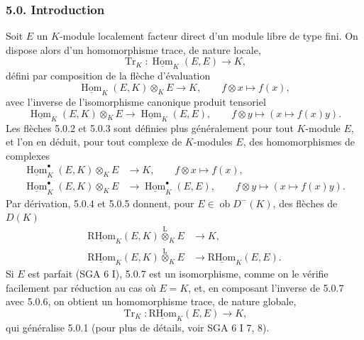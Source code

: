 \documentclass[11pt]{article}
\DeclareMathOperator{\Hom}{Hom}
\newcommand{\R}{\mathrm{R}}\newcommand{\RHomCore}{\mathrm{RHom}}
\newcommand{\ob}{\operatorname{ob}}
\providecommand{\RHom}{\RHomCore}
\providecommand{\uRHom}{\underline{\RHom}}
\providecommand{\uHom}{\underline{\Hom}}
\providecommand{\Tr}{\operatorname{Tr}}
\providecommand{\Tr}{\operatorname{Tr}}
\providecommand{\lten}{\overset{\mathrm L}{\otimes}}
\providecommand{\Tr}{\operatorname{Tr}}
\providecommand{\RHom}{\RHomCore}
\providecommand{\Hom}{\operatorname{Hom}}
\providecommand{\ob}{\operatorname{ob}}
\providecommand{\lten}{\overset{\mathrm L}{\otimes}}
\providecommand{\RHom}{\R\mathcal{H}om}
\providecommand{\lten}{\overset{\mathrm L}{\otimes}}
\providecommand{\R}{\mathrm R}
\providecommand{\Tr}{\operatorname{Tr}}
\providecommand{\lten}{\overset{\mathrm L}{\otimes}}
\providecommand{\lten}{\overset{\mathrm L}{\otimes}}
\providecommand{\lten}{\overset{\mathrm L}{\otimes}}
\providecommand{\RHom}{\RHomCore}
\providecommand{\Hom}{\operatorname{Hom}}
\providecommand{\Tr}{\operatorname{Tr}}
\providecommand{\lten}{\overset{\mathrm L}{\otimes}}
\begin{document}
\subsubsection*{5.0. Introduction}

Soit $E$ un $K$-module localement facteur direct d'un module libre de type fini. On dispose alors d'un homomorphisme trace, de nature locale,
\begin{equation}\tag{5.0.1}
\Tr_K:\uHom_K(E,E)\longrightarrow K,
\end{equation}
défini par composition de la flèche d'évaluation
\begin{equation}\tag{5.0.2}
\uHom_K(E,K)\otimes_KE\longrightarrow K,\qquad f\otimes x\longmapsto f(x),
\end{equation}
avec l'inverse de l'isomorphisme canonique produit tensoriel
\begin{equation}\tag{5.0.3}
\uHom_K(E,K)\otimes_KE\longrightarrow\uHom_K(E,E),\qquad f\otimes y\longmapsto (x\longmapsto f(x)y).
\end{equation}
Les flèches 5.0.2 et 5.0.3 sont définies plus généralement pour tout $K$-module $E$, et l'on en déduit, pour tout complexe de $K$-modules $E$, des homomorphismes de complexes
\begin{align}
\uHom_K^\bullet(E,K)\otimes_KE&\longrightarrow K,\qquad f\otimes x\longmapsto f(x),\tag{5.0.4}\\
\uHom_K^\bullet(E,K)\otimes_KE&\longrightarrow \uHom_K^\bullet(E,E),\qquad f\otimes y\longmapsto (x\longmapsto f(x)y).\tag{5.0.5}
\end{align}
Par dérivation, 5.0.4 et 5.0.5 donnent, pour $E\in\ob D^-(K)$, des flèches de $D(K)$
\begin{align}
\uRHom_K(E,K)\lten_KE&\longrightarrow K,\tag{5.0.6}\\
\uRHom_K(E,K)\lten_KE&\longrightarrow\uRHom_K(E,E).\tag{5.0.7}
\end{align}
Si $E$ est parfait (SGA 6 I), 5.0.7 est un isomorphisme, comme on le vérifie facilement par réduction au cas où $E=K$, et, en composant l'inverse de 5.0.7 avec 5.0.6, on obtient un homomorphisme trace, de nature globale,
\begin{equation}\tag{5.0.8}
\Tr_K:\uRHom_K(E,E)\longrightarrow K,
\end{equation}
qui généralise 5.0.1 (pour plus de détails, voir SGA 6 I 7, 8).
\end{document}

